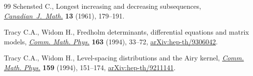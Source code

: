 \documentclass[pdftex]{sigma}%
\numberwithin{equation}{section}
\begin{document}
\begin{thebibliography}{99}
Schensted C., Longest increasing and decreasing subsequences,
 \href{https://doi.org/10.4153/CJM-1961-015-3}{\textit{Canadian~J.~Math.}} \textbf{13} (1961), 179--191.

Tracy C.A., Widom H., Fredholm determinants, differential equations and matrix
 models, \href{https://doi.org/10.1007/BF02101734}{\textit{Comm. Math. Phys.}} \textbf{163} (1994), 33--72,
 \href{https://arxiv.org/abs/hep-th/9306042}{arXiv:hep-th/9306042}.

Tracy C.A., Widom H., Level-spacing distributions and the {A}iry kernel,
 \href{https://doi.org/10.1007/BF02100489}{\textit{Comm. Math. Phys.}} \textbf{159} (1994), 151--174,
 \href{https://arxiv.org/abs/hep-th/9211141}{arXiv:hep-th/9211141}.

\end{thebibliography}\LastPageEnding
\end{document}
